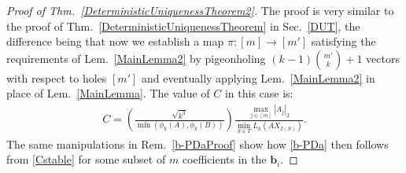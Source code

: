 \documentclass[journal, twocolumn]{IEEEtran}
\newtheorem{theorem}{Theorem}
\newtheorem{lemma}{Lemma}
\begin{document}
\begin{proof}[Proof of Thm.~\ref{DeterministicUniquenessTheorem2}]
The proof is very similar to the proof of Thm.~\ref{DeterministicUniquenessTheorem} in Sec.~\ref{DUT}, the difference being that now we establish a map $\pi: [m] \to [m']$ satisfying the requirements of Lem.~\ref{MainLemma2} by pigeonholing $(k-1){m' \choose k} + 1$ vectors with respect to holes $[m']$ and eventually applying Lem.~\ref{MainLemma2} in place of Lem.~\ref{MainLemma}. The value of $C$ in this case is:
\begin{align}\label{Cdef2}
C= \left( \frac{ \sqrt{k^3}}{ \min(\phi_k(A), \phi_k(B)) } \right) \frac{\max_{j \in [m]} |A_j|_2}{\min_{S \in T} L_k(AX_{I(S)})}.
\end{align}
The same manipulations in Rem.~\ref{b-PDaProof} show how \eqref{b-PDa} then follows from \eqref{Cstable} for some subset of $m$ coefficients in the $\mathbf{b}_i$. 
\end{proof}






\end{document}

